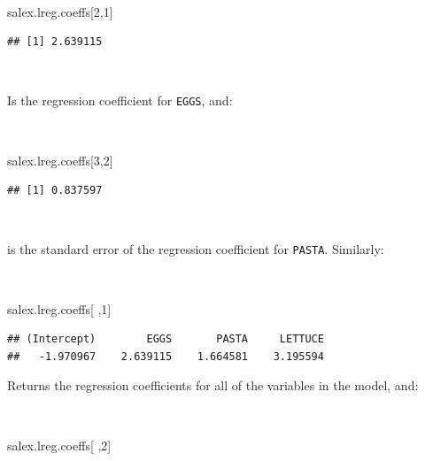 \documentclass[12pt,a4paper]{book}
\newenvironment{Shaded}{\begin{snugshade}}{\end{snugshade}}
\newcommand{\DecValTok}[1]{\textcolor[rgb]{0.00,0.00,0.81}{#1}}
\newcommand{\NormalTok}[1]{#1}
\theoremstyle{definition}
\theoremstyle{definition}
\theoremstyle{definition}
\theoremstyle{remark}
\begin{document}
~

\begin{Shaded}
\begin{Highlighting}[]
\NormalTok{salex.lreg.coeffs[}\DecValTok{2}\NormalTok{,}\DecValTok{1}\NormalTok{]}
\end{Highlighting}
\end{Shaded}

\begin{verbatim}
## [1] 2.639115
\end{verbatim}

~

Is the regression coefficient for \texttt{EGGS}, and:

~

\begin{Shaded}
\begin{Highlighting}[]
\NormalTok{salex.lreg.coeffs[}\DecValTok{3}\NormalTok{,}\DecValTok{2}\NormalTok{]}
\end{Highlighting}
\end{Shaded}

\begin{verbatim}
## [1] 0.837597
\end{verbatim}

~

is the standard error of the regression coefficient for \texttt{PASTA}.
Similarly:

~

\begin{Shaded}
\begin{Highlighting}[]
\NormalTok{salex.lreg.coeffs[ ,}\DecValTok{1}\NormalTok{]}
\end{Highlighting}
\end{Shaded}

\begin{verbatim}
## (Intercept)        EGGS       PASTA     LETTUCE 
##   -1.970967    2.639115    1.664581    3.195594
\end{verbatim}

\newpage

Returns the regression coefficients for all of the variables in the
model, and:

~

\begin{Shaded}
\begin{Highlighting}[]
\NormalTok{salex.lreg.coeffs[ ,}\DecValTok{2}\NormalTok{]}
\end{Highlighting}
\end{Shaded}
\end{document}
